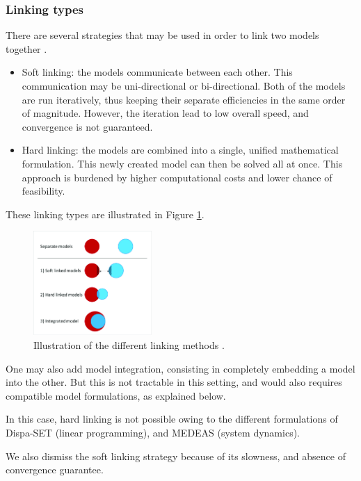 \subsubsection{Linking types}

There are several strategies that may be used in order to link two models together \cite{linkings-stuff}.

\begin{itemize}
    \item Soft linking: the models communicate between each other. This communication may be uni-directional or bi-directional. Both of the models are run iteratively, thus keeping their separate efficiencies in the same order of magnitude. However, the iteration lead to low overall speed, and convergence is not guaranteed.
    \item Hard linking: the models are combined into a single, unified mathematical formulation. This newly created model can then be solved all at once. This approach is burdened by higher computational costs and lower chance of feasibility.
\end{itemize}

These linking types are illustrated in Figure \ref{fig:linking-types}.

\begin{figure}[h]
    \centering
    \includegraphics[width=0.4\textwidth]{resources/images/hybrid_model_variants.png}
    \caption{Illustration of the different linking methods \cite{hybrid_models}.}
    \label{fig:linking-types}
\end{figure}

One may also add model integration, consisting in completely embedding a model into the other. But this is not tractable in this setting, and would also requires compatible model formulations, as explained below.

In this case, hard linking is not possible owing to the different formulations of Dispa-SET (linear programming), and MEDEAS (system dynamics).

We also dismiss the soft linking strategy because of its slowness, and absence of convergence guarantee.

